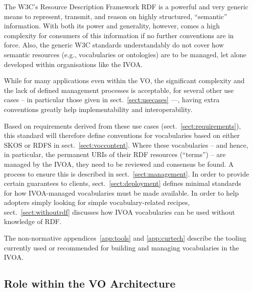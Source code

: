 \documentclass[11pt,a4paper]{ivoa}
\begin{document}
The W3C's Resource Description Framework RDF \citep{note:rdfprimer} is a powerful
and very generic means to represent, transmit, and reason on highly
structured, ``semantic'' information.  With both its power and
generality, however, comes a high complexity for consumers of this
information if no further conventions are in force.  Also, the generic
W3C standards understandably do not cover how semantic resources (e.g.,
vocabularies or ontologies) are to be managed, let alone developed
within organisations like the IVOA.

While for many applications even within the VO, the significant
complexity and the lack of defined management processes is acceptable, 
for several other use cases -- in particular those given in
sect.~\ref{sect:usecases} ––, having extra conventions greatly
help implementability and interoperability.

Based on requirements derived from these use cases 
(sect.~\ref{sect:requirements}), this standard will therefore define
conventions for vocabularies based on either SKOS \citep{std:skos} or
RDFS \citep{std:rdfs} in
sect.~\ref{sect:voccontent}.  Where these vocabularies -- and hence, in
particular, the permanent URIs of their RDF resources (``terms'') 
-- are managed by the
IVOA, they need to be reviewed and consensus be found.  A process to
ensure this is described in
sect.~\ref{sect:management}.  In order
to provide certain guarantees to clients, sect.~\ref{sect:deployment}
defines minimal standards for how IVOA-managed vocabularies must be made
available.  In order to help adopters simply looking for simple
vocabulary-related recipes, sect.~\ref{sect:withoutrdf} discusses how IVOA
vocabularies can be used without knowledge of RDF.

The non-normative appendices~\ref{app:tools} and \ref{app:curtech} 
describe the tooling
currently used or recommended for building and managing vocabularies in the
IVOA.


\subsection{Role within the VO Architecture}
\end{document}
